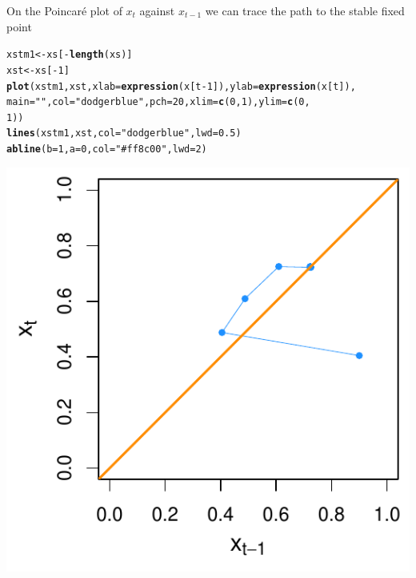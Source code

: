 \documentclass[Tutorial]{../cbg}\usepackage[]{graphicx}\usepackage[]{color}
\makeatletter
\def\maxwidth{ %
  \ifdim\Gin@nat@width>\linewidth
    \linewidth
  \else
    \Gin@nat@width
  \fi
}
\newcommand{\hlnum}[1]{\textcolor[rgb]{0.686,0.059,0.569}{#1}}%
\newcommand{\hlstr}[1]{\textcolor[rgb]{0.192,0.494,0.8}{#1}}%
\newcommand{\hlopt}[1]{\textcolor[rgb]{0,0,0}{#1}}%
\newcommand{\hlstd}[1]{\textcolor[rgb]{0.345,0.345,0.345}{#1}}%
\newcommand{\hlkwb}[1]{\textcolor[rgb]{0.69,0.353,0.396}{#1}}%
\newcommand{\hlkwc}[1]{\textcolor[rgb]{0.333,0.667,0.333}{#1}}%
\newcommand{\hlkwd}[1]{\textcolor[rgb]{0.737,0.353,0.396}{\textbf{#1}}}%
\newenvironment{kframe}{%
 \def\at@end@of@kframe{}%
 \ifinner\ifhmode%
  \def\at@end@of@kframe{\end{minipage}}%
  \begin{minipage}{\columnwidth}%
 \fi\fi%
 \def\FrameCommand##1{\hskip\@totalleftmargin \hskip-\fboxsep
 \colorbox{shadecolor}{##1}\hskip-\fboxsep
     \hskip-\linewidth \hskip-\@totalleftmargin \hskip\columnwidth}%
 \MakeFramed {\advance\hsize-\width
   \@totalleftmargin\z@ \linewidth\hsize
   \@setminipage}}%
 {\par\unskip\endMakeFramed%
 \at@end@of@kframe}
\newenvironment{knitrout}{}{} %
\makeatother
\begin{document}
On the Poincar\'e plot of $x_t$ against $x_{t-1}$ we can trace the path to the stable fixed point

\begin{knitrout}
\color{fgcolor}\begin{kframe}
\begin{alltt}
\hlstd{xstm1} \hlkwb{<-} \hlstd{xs[}\hlopt{-}\hlkwd{length}\hlstd{(xs)]}
\hlstd{xst} \hlkwb{<-} \hlstd{xs[}\hlopt{-}\hlnum{1}\hlstd{]}
\hlkwd{plot}\hlstd{(xstm1, xst,} \hlkwc{xlab} \hlstd{=} \hlkwd{expression}\hlstd{(x[t} \hlopt{-} \hlnum{1}\hlstd{]),} \hlkwc{ylab} \hlstd{=} \hlkwd{expression}\hlstd{(x[t]),}
    \hlkwc{main} \hlstd{=} \hlstr{""}\hlstd{,} \hlkwc{col} \hlstd{=} \hlstr{"dodgerblue"}\hlstd{,} \hlkwc{pch} \hlstd{=} \hlnum{20}\hlstd{,} \hlkwc{xlim} \hlstd{=} \hlkwd{c}\hlstd{(}\hlnum{0}\hlstd{,} \hlnum{1}\hlstd{),} \hlkwc{ylim} \hlstd{=} \hlkwd{c}\hlstd{(}\hlnum{0}\hlstd{,}
        \hlnum{1}\hlstd{))}
\hlkwd{lines}\hlstd{(xstm1, xst,} \hlkwc{col} \hlstd{=} \hlstr{"dodgerblue"}\hlstd{,} \hlkwc{lwd} \hlstd{=} \hlnum{0.5}\hlstd{)}
\hlkwd{abline}\hlstd{(}\hlkwc{b} \hlstd{=} \hlnum{1}\hlstd{,} \hlkwc{a} \hlstd{=} \hlnum{0}\hlstd{,} \hlkwc{col} \hlstd{=} \hlstr{"#ff8c00"}\hlstd{,} \hlkwc{lwd} \hlstd{=} \hlnum{2}\hlstd{)}
\end{alltt}
\end{kframe}

{\centering \includegraphics[width=\maxwidth]{figure/minimal-unnamed-chunk-5-1} 

}



\end{knitrout}
\end{document}
